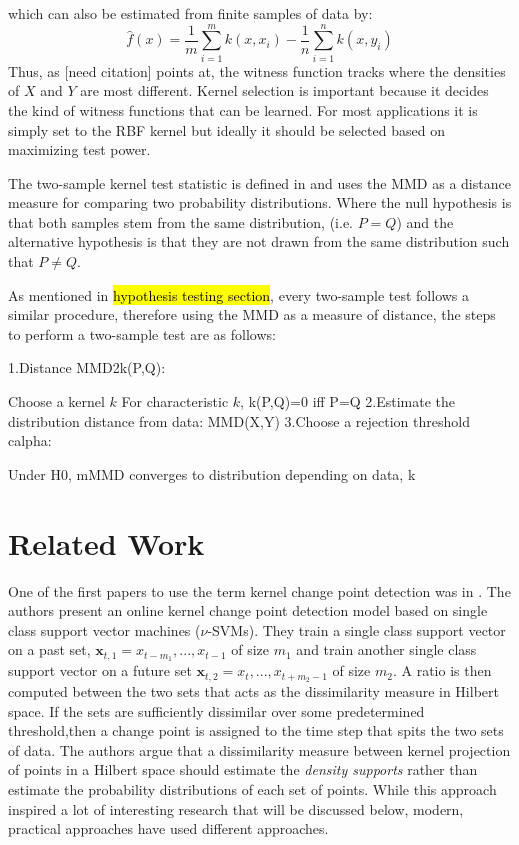 which can also be estimated from finite samples of data by:
\begin{equation}
\hat{f}(x)=\frac{1}{m} \sum_{i=1}^{m} k\left(x, x_{i}\right)-\frac{1}{n} \sum_{i=1}^{n} k\left(x, y_{i}\right)
\end{equation}
Thus, as [need citation] points at, the witness function tracks where the densities of $X$ and $Y$ are most different. 
Kernel selection is important because it decides the kind of witness functions that can be learned. For most applications it is simply set to the RBF kernel but ideally it should be selected based on maximizing test power.

The two-sample kernel test statistic is defined in \cite{gretton2012kernel} and uses the MMD as a distance measure for comparing two probability distributions. Where the null hypothesis is that both samples stem from the same distribution,  (i.e. $P=Q$) and the alternative hypothesis is that they are not drawn from the same distribution such that $P \neq Q$.

As mentioned in \hl{hypothesis testing section}, every two-sample test follows a similar procedure, therefore using the MMD as a measure of distance, the steps to perform a two-sample test  are as follows:

1.Distance MMD2k(P,Q):

Choose a kernel $k$
For characteristic $k$, k(P,Q)=0 iff P=Q
2.Estimate the distribution distance from data: MMD(X,Y)
3.Choose a rejection threshold calpha:

Under H0, mMMD converges to distribution depending on data, k

\section{Related Work}

One of the first papers to use the term kernel change point detection was in \cite{desobry2005online}. The authors present an online kernel change point detection model based on single class support vector machines ($\nu$-SVMs). They train a single class support vector on a past set, $\mathbf{x}_{t,1}={x_{t-m_1},...,x_{t-1}}$ of size $m_1$ and train another single class support vector on a future set $\mathbf{x}_{t,2}={x_t,...,x_{t+m_2-1}}$ of size $m_2$. A ratio is then computed between the two sets that acts as the dissimilarity measure in Hilbert space. If the sets are sufficiently dissimilar over some predetermined threshold,then a change point is assigned to the time step that spits the two sets of data. The authors argue that a dissimilarity measure between kernel projection of points in a Hilbert space should estimate the \textit{density supports} rather than estimate the probability distributions of each set of points. While this approach inspired a lot of interesting research that will be discussed below, modern, practical approaches have used different approaches.

